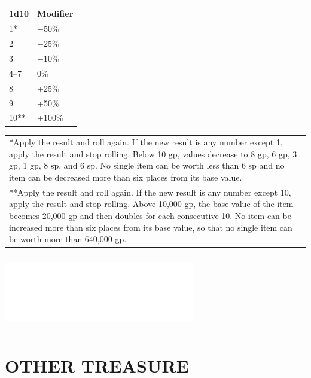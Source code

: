 \begin{multicols}{2}
\begin{minipage}{\columnwidth}
\end{minipage}

\noindent
\begin{minipage}{\columnwidth}

\label{artvariation}
\noindent
\begin{tabular}{|p{}|p{}|}
\hline
1d10	& Modifier \\
\hline\hline
\rowcolor[gray]{.9}1*	& $-50$\% \\
2	& $-25$\% \\
\rowcolor[gray]{.9}3	& $-10$\% \\
4--7	& 0\% \\
\rowcolor[gray]{.9}8	& +25\% \\
9	& +50\% \\
\rowcolor[gray]{.9}10**	& +100\% \\
\hline
\end{tabular}
\noindent\begin{tabular}{p{}}
*Apply the result and roll again.  If the new result is any number except 1, apply the result and stop rolling.  Below 10 gp, values decrease to 8 gp, 6 gp, 3 gp, 1 gp, 8 sp, and 6 sp.  No single item can be worth less than 6 sp and no item can be decreased more than six places from its base value. \\
**Apply the result and roll again.  If the new result is any number except 10, apply the result and stop rolling.  Above 10,000 gp, the base value of the item becomes 20,000 gp and then doubles for each consecutive 10.  No item can be increased more than six places from its base value, so that no single item can be worth more than 640,000 gp. \\
\end{tabular}\vspace{.5em}

\end{minipage}

\noindent\includegraphics[width=3.3in, height=1.25in]{testblock.pdf} 

\section{OTHER TREASURE} 


\end{multicols}
